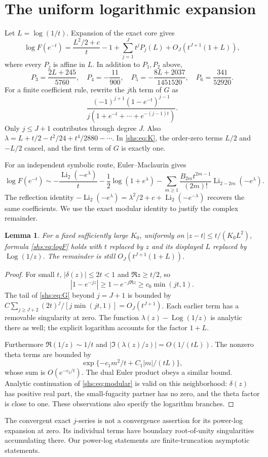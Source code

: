 \documentclass[11pt]{article}
\newtheorem{lemma}[theorem]{Lemma}
\newcommand{\Li}{\operatorname{Li}}
\newcommand{\Log}{\operatorname{Log}}
\theoremstyle{definition}
\theoremstyle{plain}
\begin{document}
\section{The uniform logarithmic expansion}\label{shs:sec:log}
Let $L=\log(1/t)$. Expansion of the exact core gives
\begin{equation}\label{shs:eq:logF}
 \log F(e^{-t})=\frac{L^2/2+c}{t}-1+
 \sum_{j=1}^{J}t^jP_j(L)+O_J(t^{J+1}(1+L)),
\end{equation}
where every $P_j$ is affine in $L$. In addition to $P_1,P_2$ above,
\[
 P_3=\frac{2L+245}{5760},\quad P_4=-\frac{11}{900},\quad
 P_5=-\frac{8L+2037}{1451520},\quad P_6=\frac{341}{52920}.
\]
For a finite coefficient rule, rewrite the $j$th term of $G$ as
\[
 \frac{(-1)^{j+1}(1-e^{-t})^{j-1}}
 {j(1+e^{-t}+\cdots+e^{-(j-1)t})}.
\]
Only $j\le J+1$ contributes through degree $J$. Also
$\lambda=L+t/2-t^2/24+t^4/2880-\cdots$.
In \eqref{shs:eq:K}, the order-zero terms $L/2$ and $-L/2$ cancel, and
the first term of $G$ is exactly one.

For an independent symbolic route, Euler--Maclaurin gives
\[
 \log F(e^{-t})\sim-\frac{\Li_2(-e^\lambda)}{t}
 -\frac12\log(1+e^\lambda)
 -\sum_{m\ge1}\frac{B_{2m}t^{2m-1}}{(2m)!}\Li_{2-2m}(-e^\lambda).
\]
The reflection identity
$-\Li_2(-e^\lambda)=\lambda^2/2+c+\Li_2(-e^{-\lambda})$
recovers the same coefficients. We use the exact modular identity to
justify the complex remainder.

\begin{lemma}\label{shs:lem:complex}
For a fixed sufficiently large $K_0$, uniformly on
$|z-t|\le t/(K_0L^2)$, formula \eqref{shs:eq:logF} holds with $t$ replaced by
$z$ and its displayed $L$ replaced by $\Log(1/z)$. The remainder is still
$O_J(t^{J+1}(1+L))$.
\end{lemma}
\begin{proof}
For small $t$, $|\delta(z)|\le2t<1$ and $\Re z\ge t/2$, so
\[
 |1-e^{-jz}|\ge1-e^{-j\Re z}\ge c_0\min(jt,1).
\]
The tail of \eqref{shs:eq:G} beyond $j=J+1$ is bounded by
$C\sum_{j\ge J+2}(2t)^j/[j\min(jt,1)]=O_J(t^{J+1})$.
Each earlier term has a removable singularity at zero. The function
$\lambda(z)-\Log(1/z)$ is analytic there as well; the explicit logarithm
accounts for the factor $1+L$.

Furthermore $\Re(1/z)\sim1/t$ and
$|\Im(\lambda(z)/z)|=O(1/(tL))$. The nonzero theta terms are bounded by
\[
 \exp\{-c_1m^2/t+C_1|m|/(tL)\},
\]
whose sum is $O(e^{-c_2/t})$. The dual Euler product obeys a similar
bound. Analytic continuation of \eqref{shs:eq:modular} is valid on this
neighborhood: $\delta(z)$ has positive real part, the small-fugacity
partner has no zero, and the theta factor is close to one. These
observations also specify the logarithm branches.
\end{proof}
The convergent exact $j$-series is not a convergence assertion for its
power-log expansion at zero. Its individual terms have boundary
root-of-unity singularities accumulating there. Our power-log statements
are finite-truncation asymptotic statements.
\end{document}
